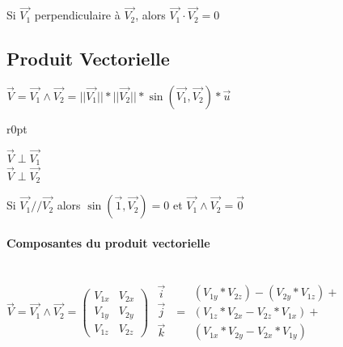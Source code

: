 Si $\vec{V_1}$ perpendiculaire à $\vec{V_2}$, alors $\vec{V_1}\cdot\vec{V_2} = 0$

\subsection{Produit Vectorielle}

$\vec{V} = \vec{V_1} \wedge \vec{V_2} = ||\vec{V_1}||*||\vec{V_2}||*\sin(\vec{V_1}, \vec{V_2})*\vec{u}$

\begin{wrapfigure}[5]{r}{0pt}
\end{wrapfigure}

$\vec{V} \perp \vec{V_1}$
~\\
$\vec{V} \perp \vec{V_2}$

Si $\vec{V_1} // \vec{V_2}$ alors $\sin(\vec{1}, \vec{V_2}) = 0$ et $\vec{V_1} \wedge \vec{V_2} = \vec{0}$

\paragraph{Composantes du produit vectorielle}
~\\
$\vec{V} = \vec{V_1} \wedge \vec{V_2} = 
	\left(
		\begin{array}{rl}
		V_{1x} & V_{2x} \\
		V_{1y} & V_{2y} \\
		V_{1z} & V_{2z}
		\end{array}
	\right)$
$	\begin{array}{c}
		\vec{i} \\
		\vec{j} \\
		\vec{k} \\

	\end{array}$
	$=
	\begin{array}{c}
		(V_{1y} * V_{2z})-(V_{2y}*V_{1z}) + \\
		(V_{1z}*V_{2x} - V_{2z}*V_{1x}) + \\
		(V_{1x}*V_{2y} - V_{2x}*V_{1y}) 
	\end{array}$

